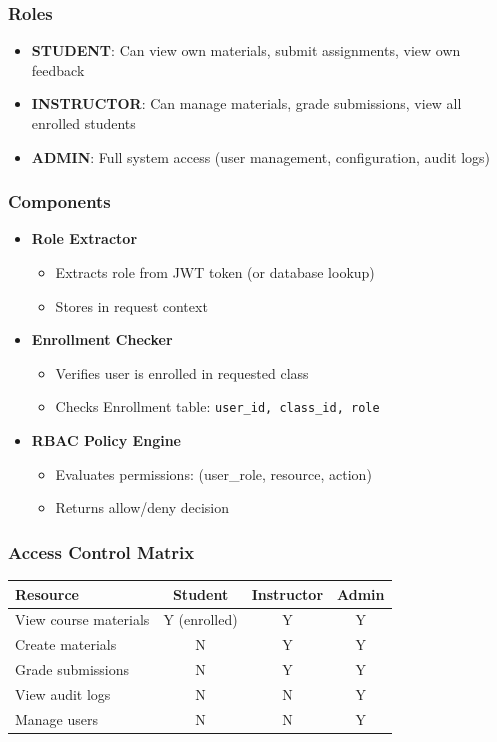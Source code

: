 \documentclass[12pt,oneside,a4paper]{article}
\begin{document}
\subsubsection{Roles}
\begin{itemize}
    \item \textbf{STUDENT}: Can view own materials, submit assignments, view own feedback
    \item \textbf{INSTRUCTOR}: Can manage materials, grade submissions, view all enrolled students
    \item \textbf{ADMIN}: Full system access (user management, configuration, audit logs)
\end{itemize}

\subsubsection{Components}
\begin{itemize}
    \item \textbf{Role Extractor}
        \begin{itemize}
            \item Extracts role from JWT token (or database lookup)
            \item Stores in request context
        \end{itemize}
    \item \textbf{Enrollment Checker}
        \begin{itemize}
            \item Verifies user is enrolled in requested class
            \item Checks Enrollment table: \texttt{user\_id, class\_id, role}
        \end{itemize}
    \item \textbf{RBAC Policy Engine}
        \begin{itemize}
            \item Evaluates permissions: (user\_role, resource, action)
            \item Returns allow/deny decision
        \end{itemize}
\end{itemize}

\subsubsection{Access Control Matrix}

\begin{tabularx}{\textwidth}{|l|c|c|c|}
    \hline
    \textbf{Resource} & \textbf{Student} & \textbf{Instructor} & \textbf{Admin} \\
    \hline
    View course materials & Y (enrolled) & Y & Y \\
    Create materials & N & Y & Y \\
    Grade submissions & N & Y & Y \\
    View audit logs & N & N & Y \\
    Manage users & N & N & Y \\
    \hline
\end{tabularx}
\end{document}
